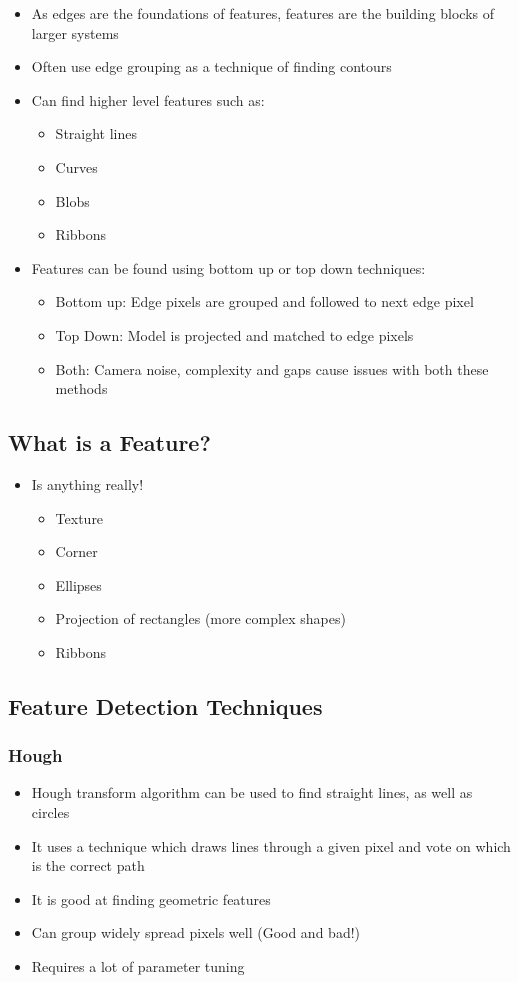 \documentclass[a4paper]{article}
\begin{document}
\begin{itemize}
\item As edges are the foundations of features, features are the building blocks of larger systems
\item Often use edge grouping as a technique of finding contours
\item Can find higher level features such as:
\begin{itemize}
\item Straight lines
\item Curves
\item Blobs
\item Ribbons
\end{itemize}
\item Features can be found using bottom up or top down techniques:
\begin{itemize}
\item Bottom up: Edge pixels are grouped and followed to next edge pixel
\item Top Down: Model is projected and matched to edge pixels
\item Both: Camera noise, complexity and gaps cause issues with both these methods
\end{itemize}
\end{itemize}
\subsection{What is a Feature?}
\label{sec-2-1}
\begin{itemize}
\item Is anything really!
\begin{itemize}
\item Texture
\item Corner
\item Ellipses
\item Projection of rectangles (more complex shapes)
\item Ribbons
\end{itemize}
\end{itemize}
\subsection{Feature Detection Techniques}
\label{sec-2-2}
\subsubsection{Hough}
\label{sec-2-2-1}
\begin{itemize}
\item Hough transform algorithm can be used to find straight lines, as well as circles
\item It uses a technique which draws lines through a given pixel and vote on which is the correct path
\item It is good at finding geometric features
\item Can group widely spread pixels well (Good and bad!)
\item Requires a lot of parameter tuning
\end{itemize}
\end{document}

